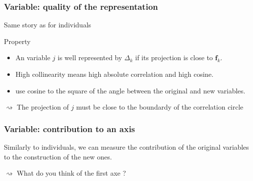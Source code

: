 \begin{frame}[fragile]
  \frametitle{Variable: quality of the representation}

  Same story as for individuals
  \begin{block}{Property}
    \begin{itemize}
      \item  An variable $j$ is well represented by $\Delta_k$ if its projection is close to $\mathbf{f}_k$.
      \item  High collinearity means high absolute correlation and high cosine.
      \item  use cosine to the square of the angle between the original and new variables.
    \end{itemize}
   $\rightsquigarrow$ The projection of $j$ must be close to the boundardy of the correlation circle
  \end{block}
 
\begin{knitrout}
\color{fgcolor}
\end{knitrout}

\end{frame}

\begin{frame}[fragile]
  \frametitle{Variable: contribution to an axis}
  
  Similarly to individuals, we can measure the contribution of the original variables to the construction of the new ones.
  
\begin{knitrout}
\color{fgcolor}
\end{knitrout}

\vfill

$\rightsquigarrow$ What do you think of the first axe ?

\end{frame}
